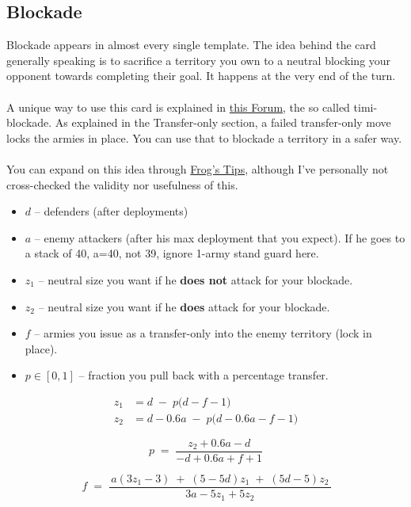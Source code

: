 \subsection{Blockade}

Blockade appears in almost every single template. The idea behind the card generally speaking is to sacrifice a territory you own to a neutral blocking your opponent towards completing their goal. It happens at the very end of the turn. 
\\
\\
A unique way to use this card is explained in \href{https://www.warzone.com/Forum/94540-blockade-pro}{this Forum}, the so called timi-blockade. As explained in the Transfer-only section, a failed transfer-only move locks the armies in place. You can use that to blockade a territory in a safer way.
\\
\\
You can expand on this idea through \href{https://www.warzone.com/Forum/149405-trans-attc-percentage-cards?Offset=0}{Frog's Tips}, although I've personally not cross-checked the validity nor usefulness of this.
\begin{itemize}
  \item \(d\) – defenders  \hfill(after deployments)
  \item \(a\) – enemy attackers (after his max deployment that you expect). If he goes to a stack of 40, a=40, not 39, ignore 1-army stand guard here.
  \item \(z_1\) – neutral size you want if he \textbf{does not} attack for your blockade.
  \item \(z_2\) – neutral size you want if he \textbf{does}   attack for your blockade.
  \item \(f\) – armies you issue as a transfer-only into the enemy territory (lock in place).
  \item \(p\in[0,1]\) – fraction you pull back with a percentage transfer.
\end{itemize}

\begin{align}
z_1 &= d \;-\; p\bigl(d-f-1\bigr) \tag{I} \\
z_2 &= d - 0.6a \;-\; p\bigl(d-0.6a-f-1\bigr) \tag{II}
\end{align}

\[
\boxed{\,p \;=\; \dfrac{\,z_2 + 0.6a - d\,}{-d + 0.6a + f + 1}\,}
\]

\[
\boxed{\,f \;=\;
\dfrac{\,a\!\left(3z_1-3\right) \;+\; (5-5d)z_1 \;+\; (5d-5)z_2\,}
      {\,3a - 5z_1 + 5z_2\,}}
\]


